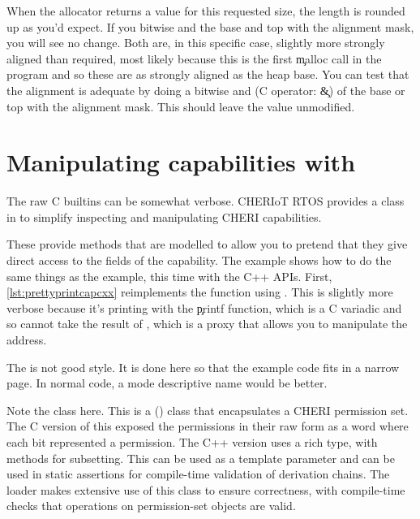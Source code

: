 {{{{{{{{When the allocator returns a value for this requested size, the length is rounded up as you'd expect.
If you bitwise and the base and top with the alignment mask, you will see no change.
Both are, in this specific case, slightly more strongly aligned than required, most likely because this is the first \c{malloc} call in the program and so these are as strongly aligned as the heap base.
You can test that the alignment is adequate by doing a bitwise and (C operator: \c{&}) of the base or top with the alignment mask.
This should leave the value unmodified.

\section[label=cheri_capability_cpp]{Manipulating capabilities with }

The raw C builtins can be somewhat verbose.
CHERIoT RTOS provides a  class in  to simplify inspecting and manipulating CHERI capabilities.

These provide methods that are modelled to allow you to pretend that they give direct access to the fields of the capability.
The  example shows how to do the same things as the  example, this time with the C++ APIs.
First, \ref{lst:prettyprintcapcxx} reimplements the  function using .
This is slightly more verbose because it's printing with the \c{printf} function, which is a C variadic and so cannot take the result of , which is a proxy that allows you to manipulate the address.

\codelisting[filename=examples/manipulate_capabilities_cxx/example.cc,marker=print_capability,label=lst:prettyprintcapcxx,caption="Pretty printing a capability using the C++ APIs."]{}

\begin{note}
The  is not good style.
It is done here so that the example code fits in a narrow page.
In normal code, a mode descriptive name would be better.
\end{note}

Note the  class here.
This is a () class that encapsulates a CHERI permission set.
The C version of this exposed the permissions in their raw form as a word where each bit represented a permission.
The C++ version uses a rich type, with methods for subsetting.
This can be used as a template parameter and can be used in static assertions for compile-time validation of derivation chains.
The loader makes extensive use of this class to ensure correctness, with compile-time checks that operations on permission-set objects are valid.

}}}}}}}}
